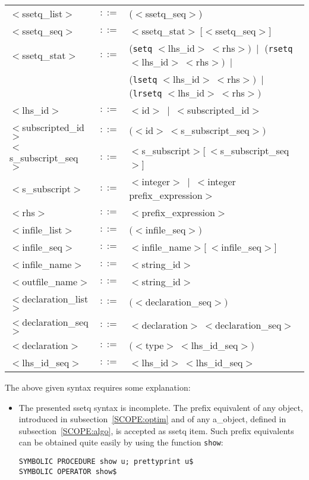 {\begin{center}
\begin{tabular}{lcl}
$<$ssetq\_list$>$ & $::=$ & ($<$ssetq\_seq$>$)\\
$<$ssetq\_seq$>$ & $::=$ & $<$ssetq\_stat$>~[<$ssetq\_seq$>]$\\
$<$ssetq\_stat$>$ & $::=$ & ({\tt setq} $<$lhs\_id$>~<$rhs$>)~\mid$
({\tt rsetq} $<$lhs\_id$>~<$rhs$>)~\mid$\\
 & & ({\tt lsetq} $<$lhs\_id$>~<$rhs$>)~\mid$
({\tt lrsetq} $<$lhs\_id$>~<$rhs$>)$\\
$<$lhs\_id$>$ & $::=$ & $<$id$>~\mid~<$subscripted\_id$>$\\
$<$subscripted\_id$>$ & $::=$ & $(<$id$>~<$s\_subscript\_seq$>)$\\
$<$s\_subscript\_seq$>$ & $::=$ & $<$s\_subscript$>[~<$s\_subscript\_seq$>$]\\
$<$s\_subscript$>$ & $::=$ & $<$integer$>~\mid~<$integer prefix\_expression$>$\\
$<$rhs$>$ & $::=$ & $<$prefix\_expression$>$\\
$<$infile\_list$>$ & $::=$ & $(<$infile\_seq$>)$\\
$<$infile\_seq$>$ & $::=$ & $<$infile\_name$>[~<$infile\_seq$>]$\\
$<$infile\_name$>$ & $::=$ & $<$string\_id$>$\\
$<$outfile\_name$>$ & $::=$ & $<$string\_id$>$\\
$<$declaration\_list$>$ & $::=$ & $(<$declaration\_seq$>)$\\
$<$declaration\_seq$>$ & $::=$ & $<$declaration$>~<$declaration\_seq$>$\\
$<$declaration$>$ & $::=$ & $(<$type$>~<$lhs\_id\_seq$>)$\\
$<$lhs\_id\_seq$>$ & $::=$ & $<$lhs\_id$>~<$lhs\_id\_seq$>$
\end{tabular}
\end{center}

The above given syntax requires some explanation:
\begin{itemize}
\item The presented ssetq syntax is incomplete. The prefix equivalent of
any object, introduced in subsection~\ref{SCOPE:optim} and of any a\_object,
defined in subsection~\ref{SCOPE:algo}, is accepted as ssetq item. Such prefix
equivalents can be obtained quite easily by using the function {\tt show}:

\hspace*{1cm} {\tt SYMBOLIC PROCEDURE show u; prettyprint u}\verb+$+ \\
\hspace*{1cm} {\tt SYMBOLIC OPERATOR show}\verb+$+


\end{itemize}}

